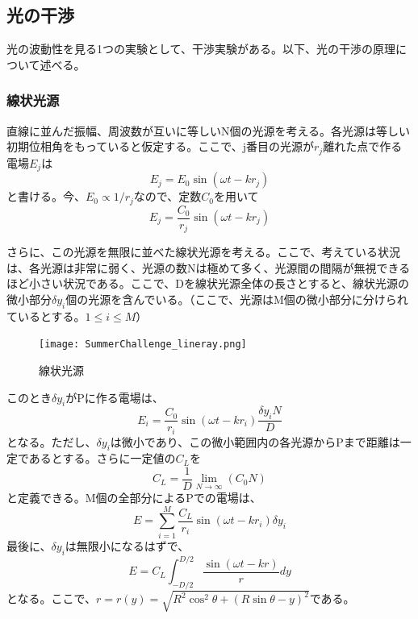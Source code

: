 \documentclass[uplatex,10pt,a4j]{jsarticle}
\begin{document}
\subsection{光の干渉}
光の波動性を見る1つの実験として、干渉実験がある。以下、光の干渉の原理について述べる。
\subsubsection{線状光源}
直線に並んだ振幅、周波数が互いに等しいN個の光源を考える。各光源は等しい初期位相角をもっていると仮定する。ここで、j番目の光源が$r_j$離れた点で作る電場$E_j$は
\[
  E_j = E_0 \sin(\omega t - k r_j)
\]
と書ける。今、$E_0 \varpropto 1/{r_j}$なので、定数$C_0$を用いて
\[
  E_j = \frac{C_0}{r_j} \sin(\omega t - k r_j)
\]



さらに、この光源を無限に並べた線状光源を考える。ここで、考えている状況は、各光源は非常に弱く、光源の数Nは極めて多く、光源間の間隔が無視できるほど小さい状況である。ここで、Dを線状光源全体の長さとすると、線状光源の微小部分$\delta y_i$個の光源を含んでいる。（ここで、光源はM個の微小部分に分けられているとする。$1 \leq i \leq M$）
\\
\begin{figure}[b]
  \begin{center}
    \texttt{[image: SummerChallenge\_lineray.png]}
    \caption{線状光源}
  \end{center}
\end{figure}

\clearpage
このとき$\delta y_i$がPに作る電場は、
\[
  E_i = \frac{C_0}{r_i} \sin(\omega t- k r_i ) \frac{\delta y_i N}{D}
\]
となる。ただし、$\delta y_i$は微小であり、この微小範囲内の各光源からPまで距離は一定であるとする。さらに一定値の$C_L$を
\[
  C_L = \frac{1}{D}  \lim_{N \to \infty} (C_0 N)
\]
と定義できる。M個の全部分によるPでの電場は、
\[
  E = \sum_{i=1}^M \frac{C_L}{r_i} \sin(\omega t - k r_i) \delta y_i
\]
最後に、$\delta y_i$は無限小になるはずで、
\[
  E = C_L \int_{-D/2}^{D/2} \frac{\sin(\omega t - k r)}{r} dy
\]
となる。ここで、$r = r(y)=\sqrt{R^2 \cos^2 \theta + (R\sin \theta - y )^2}$である。
\end{document}
